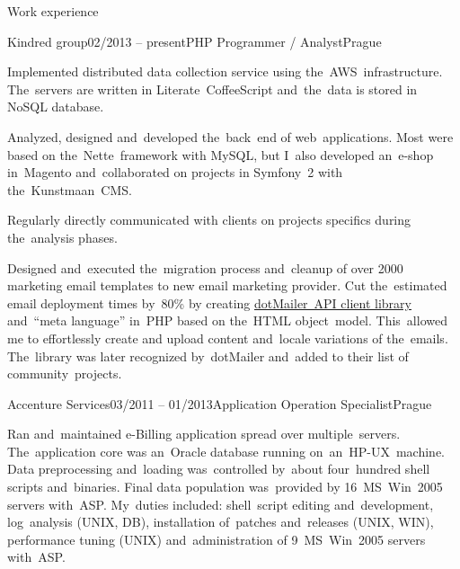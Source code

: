 \documentclass{resume}
\begin{document}
    \begin{rSection}{Work experience}

        \begin{rSubsection}{Kindred group}{02/2013 -- present}{PHP Programmer / Analyst}{Prague}
            \item Implemented distributed data collection service using the~AWS~infrastructure.
            The~servers are written in Literate~CoffeeScript and~the~data is stored in NoSQL database.

            \item Analyzed, designed and~developed the~back~end of web~applications.
            Most were based on the~Nette~framework with MySQL,
            but I~also developed an~e-shop in~Magento and~collaborated on projects in Symfony~2 with the~Kunstmaan~CMS.

            \item Regularly directly communicated with clients on projects specifics during the~analysis phases.

            \item Designed and~executed the~migration process and~cleanup of over 2000 marketing email templates
            to new email marketing provider.
            Cut the~estimated email deployment times by~80\% by
            creating \href{https://github.com/romanpitak/dotMailer-API-v2-PHP-client}{dotMailer~API client library}
            and~“meta language” in~PHP based on the~HTML object~model.
            This~allowed me to effortlessly create and upload content and~locale variations of the~emails.
            The~library was later recognized by~dotMailer and~added to their list of community~projects.
        \end{rSubsection}

        \begin{rSubsection}{Accenture Services}{03/2011 -- 01/2013}{Application Operation Specialist}{Prague}
            \item Ran and~maintained e-Billing application spread over multiple~servers.
            The~application core was \mbox{an Oracle} database running on~an~HP-UX~machine.
            Data preprocessing and~loading was~controlled by~about four~hundred shell scripts and~binaries.
            Final data population was~provided by 16~MS~Win~2005 servers with~ASP.
            My~duties included: shell~script editing and~development, log~analysis (UNIX, DB),
            installation of~patches and~releases (UNIX, WIN), performance tuning (UNIX)
            and~administration of 9~MS~Win~2005 servers with~ASP.


\end{rSubsection}
\end{rSection}
\end{document}
